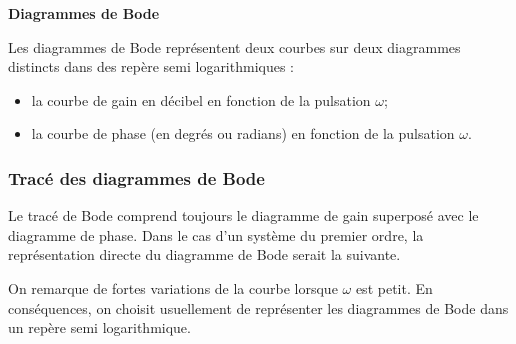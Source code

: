 \documentclass[10pt,oneside]{article}
\begin{document}
\begin{defi}
\textbf{Diagrammes de Bode}

Les diagrammes de Bode représentent deux courbes sur deux diagrammes distincts dans des repère semi logarithmiques :
\begin{itemize}
\item la courbe de gain en décibel en fonction de la pulsation $\omega$;
\item la courbe de phase (en degrés ou radians) en fonction de la pulsation $\omega$.
\end{itemize}

\end{defi}

\subsubsection{Tracé des diagrammes de Bode}
Le tracé de Bode comprend toujours le diagramme de gain superposé avec le diagramme de phase. Dans le cas d'un système du premier ordre, la représentation directe du diagramme de Bode serait la suivante.


On remarque de fortes variations de la courbe lorsque $\omega$ est petit. En conséquences, on choisit usuellement de représenter les diagrammes de Bode dans un repère semi logarithmique. 
\end{document}
